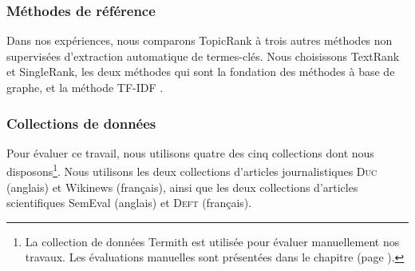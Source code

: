       \subsubsection{Méthodes de référence}
      \label{subsubsec:main-automatic_keyphrase_annotation-unsupervised_automatic_keyphrase_extraction-evaluation-baselines}
        Dans nos expériences, nous comparons TopicRank à trois autres
        méthodes non supervisées d'extraction automatique de termes-clés. Nous
        choisissons TextRank et SingleRank, les deux méthodes qui sont la
        fondation des méthodes à base de graphe, et la méthode TF-IDF .

      \subsubsection{Collections de données}
      \label{subsubsec:main-automatic_keyphrase_annotation-unsupervised_automatic_keyphrase_extraction-evaluation-evaluation_data}
        Pour évaluer ce travail, nous utilisons quatre des cinq collections dont
        nous disposons\footnote{La collection de données Termith est utilisée
        pour évaluer manuellement nos travaux. Les évaluations manuelles sont
        présentées dans le chapitre  (page \TODO{}).}. Nous utilisons
        les deux collections d'articles journalistiques \textsc{Duc} (anglais)
        et Wikinews (français), ainsi que les deux collections d'articles
        scientifiques SemEval (anglais) et \textsc{Deft} (français).

